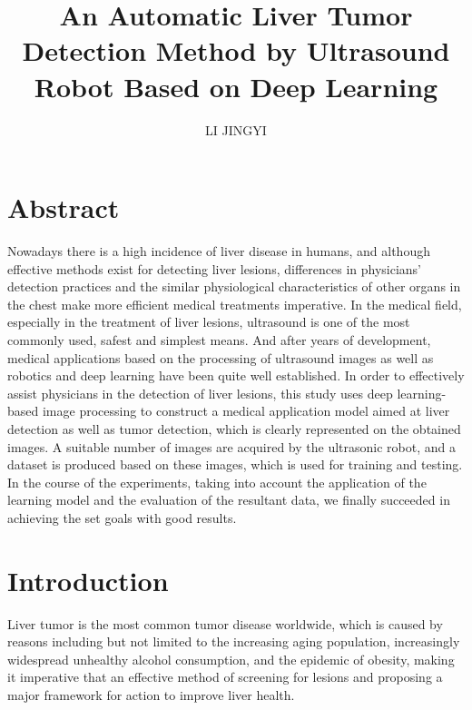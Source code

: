 \documentclass[12pt, a4paper]{article}
\title{An Automatic Liver Tumor Detection Method by Ultrasound Robot Based on Deep Learning}
\author{LI JINGYI}
\begin{document}
\maketitle
{}




\section*{Abstract}

\setlength{\parindent}{1em}
Nowadays there is a high incidence of liver disease in humans, and although effective methods exist for detecting liver lesions, differences in physicians’ detection practices and the similar physiological characteristics of other organs in the chest make more eﬀicient medical treatments imperative. In the medical field, especially in the treatment of liver lesions, ultrasound is one of the most commonly used, safest and simplest means. And after years of development, medical applications based on the processing of ultrasound images as well as robotics and deep learning have been quite well established. In order to effectively assist physicians in the detection of liver lesions, this study uses deep learning-based image processing to construct a medical application model aimed at liver detection as well as tumor detection, which is clearly represented on the obtained images. A suitable number of images are acquired by the ultrasonic robot, and a dataset is produced based on these images, which is used for training and testing. In the course of the experiments, taking into account the application of the learning model and the evaluation of the resultant data, we finally succeeded in achieving the set goals with good results.

\section{Introduction} 



\setlength{\parindent}{1em}
Liver tumor is the most common tumor disease worldwide\cite{r1}, which is caused by reasons including but not limited to the increasing aging population, increasingly widespread unhealthy alcohol consumption, and the epidemic of obesity\cite{r2}, making it imperative that an effective method of screening for lesions and proposing a major framework for action to improve liver health.\\
\end{document}
